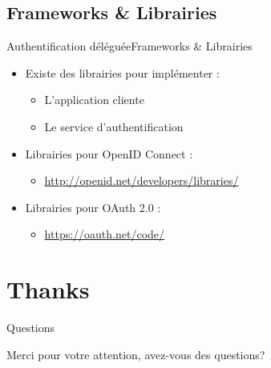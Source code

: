 \documentclass{beamer}
\begin{document}
\subsection{Frameworks \& Librairies}

\begin{frame}{Authentification déléguée}{Frameworks \& Librairies}
  \begin{center}
    \begin{itemize}
      \item Existe des librairies pour implémenter :
      \begin{itemize}
        \item L'application cliente
        \item Le service d'authentification
      \end{itemize}
      \item Librairies pour OpenID Connect :
      \begin{itemize}
        \item \href{url}{http://openid.net/developers/libraries/}
      \end{itemize}
      \item Librairies pour OAuth 2.0 :
      \begin{itemize}
        \item \href{url}{https://oauth.net/code/}
      \end{itemize}
    \end{itemize}
  \end{center}
\end{frame}

\section*{Thanks}

\begin{frame}{Questions}
  \begin{center}
    Merci pour votre attention, avez-vous des questions?
  \end{center}
\end{frame}
\end{document}
